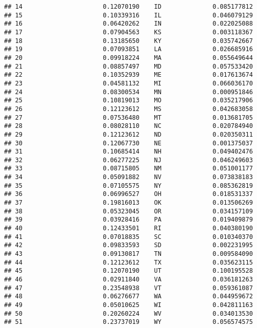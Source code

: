 \documentclass{article}\usepackage[]{graphicx}\usepackage[]{color}
\makeatletter
\newenvironment{kframe}{%
 \def\at@end@of@kframe{}%
 \ifinner\ifhmode%
  \def\at@end@of@kframe{\end{minipage}}%
  \begin{minipage}{\columnwidth}%
 \fi\fi%
 \def\FrameCommand##1{\hskip\@totalleftmargin \hskip-\fboxsep
 \colorbox{shadecolor}{##1}\hskip-\fboxsep
     \hskip-\linewidth \hskip-\@totalleftmargin \hskip\columnwidth}%
 \MakeFramed {\advance\hsize-\width
   \@totalleftmargin\z@ \linewidth\hsize
   \@setminipage}}%
 {\par\unskip\endMakeFramed%
 \at@end@of@kframe}
\newenvironment{knitrout}{}{} %
\makeatother
\begin{document}
\begin{knitrout}
\begin{kframe}
\begin{verbatim}
## 14                      0.12070190    ID              0.085177812
## 15                      0.10339316    IL              0.046079129
## 16                      0.06420262    IN              0.022025088
## 17                      0.07904563    KS              0.003118367
## 18                      0.13185650    KY              0.035742667
## 19                      0.07093851    LA              0.026685916
## 20                      0.09918224    MA              0.055649644
## 21                      0.08857497    MD              0.057533420
## 22                      0.10352939    ME              0.017613674
## 23                      0.04581132    MI              0.066036170
## 24                      0.08300534    MN              0.000951846
## 25                      0.10819013    MO              0.035217906
## 26                      0.12123612    MS              0.042683058
## 27                      0.07536480    MT              0.013681705
## 28                      0.08028110    NC              0.020784940
## 29                      0.12123612    ND              0.020350311
## 30                      0.12067730    NE              0.001375037
## 31                      0.10685414    NH              0.049402476
## 32                      0.06277225    NJ              0.046249603
## 33                      0.08715805    NM              0.051001177
## 34                      0.05091882    NV              0.073838183
## 35                      0.07105575    NY              0.085362819
## 36                      0.06996527    OH              0.018531337
## 37                      0.19816013    OK              0.013506269
## 38                      0.05323045    OR              0.034157109
## 39                      0.03928416    PA              0.019409879
## 40                      0.12433501    RI              0.040380190
## 41                      0.07018835    SC              0.010340370
## 42                      0.09833593    SD              0.002231995
## 43                      0.09130817    TN              0.009584090
## 44                      0.12123612    TX              0.035623115
## 45                      0.12070190    UT              0.100195528
## 46                      0.02911840    VA              0.036181263
## 47                      0.23548938    VT              0.059361087
## 48                      0.06276677    WA              0.044959672
## 49                      0.05010625    WI              0.042811163
## 50                      0.20260224    WV              0.034013530
## 51                      0.23737019    WY              0.056574575

\end{verbatim}
\end{kframe}
\end{knitrout}
\end{document}
